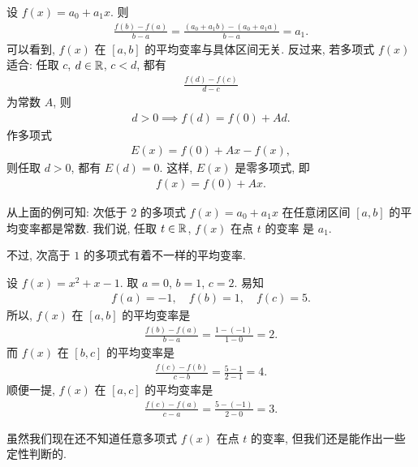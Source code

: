 \begin{example}
    设 $f(x) = a_0 + a_1 x$. 则
    \begin{align*}
        \frac{f(b) - f(a)}{b - a} = \frac{(a_0 + a_1 b) - (a_0 + a_1 a)}{b - a} = a_1.
    \end{align*}
    可以看到, $f(x)$ 在 $[a, b]$ 的平均变率与具体区间无关. 反过来, 若多项式 $f(x)$ 适合: 任取 $c$, $d \in \mathbb{R}$, $c < d$, 都有
    \begin{align*}
        \frac{f(d) - f(c)}{d - c}
    \end{align*}
    为常数 $A$, 则
    \begin{align*}
        d > 0 \implies f(d) = f(0) + Ad.
    \end{align*}
    作多项式
    \begin{align*}
        E(x) = f(0) + Ax - f(x),
    \end{align*}
    则任取 $d > 0$, 都有 $E(d) = 0$. 这样, $E(x)$ 是零多项式, 即
    \begin{align*}
        f(x) = f(0) + Ax.
    \end{align*}
\end{example}

从上面的例可知: 次低于 $2$ 的多项式 $f(x) = a_0 + a_1 x$ 在任意闭区间 $[a, b]$ 的平均变率都是常数. 我们说, 任取 $t \in \mathbb{R}$, $f(x)$ 在点 $t$ 的变率  是 $a_1$.

不过, 次高于 $1$ 的多项式有着不一样的平均变率.

\begin{example}
    设 $f(x) = x^2 + x - 1$. 取 $a = 0$, $b = 1$, $c = 2$. 易知
    \begin{align*}
        f(a) = -1, \quad f(b) = 1, \quad f(c) = 5.
    \end{align*}
    所以, $f(x)$ 在 $[a, b]$ 的平均变率是
    \begin{align*}
        \frac{f(b) - f(a)}{b - a} = \frac{1 - (-1)}{1 - 0} = 2.
    \end{align*}
    而 $f(x)$ 在 $[b, c]$ 的平均变率是
    \begin{align*}
        \frac{f(c) - f(b)}{c - b} = \frac{5 - 1}{2 - 1} = 4.
    \end{align*}
    顺便一提, $f(x)$ 在 $[a, c]$ 的平均变率是
    \begin{align*}
        \frac{f(c) - f(a)}{c - a} = \frac{5 - (-1)}{2 - 0} = 3.
    \end{align*}
\end{example}

虽然我们现在还不知道任意多项式 $f(x)$ 在点 $t$ 的变率, 但我们还是能作出一些定性判断的.

